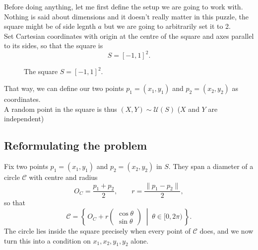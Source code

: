 \documentclass[11pt,a4paper]{article}
\theoremstyle{plain}
\theoremstyle{remark}
\begin{document}
Before doing anything, let me first define the setup we are going to work with. Nothing is said about dimensions and it doesn't really matter in this puzzle, the square might be of side legnth $a$ but we are going to arbitrarily set it to 2.
\\
Set Cartesian coordinates with origin at the centre of the square and axes parallel to its sides, so that the square is
\[
    S = [-1,1]^2 .
\]
\begin{figure}[!ht]
\centering
{}
\caption{The square $S=[-1,1]^2$.}
\end{figure}

That way, we can define our two points $p_1=(x_1, y_1)$ and $p_2 = (x_2, y_2)$  as coordinates. 
\\
A random point in the square is thus $(X, Y) \sim \mathcal{U}(S)$ ($X$ and $Y$ are independent)

\subsection*{Reformulating the problem}

Fix two points $p_1 = (x_1,y_1)$ and $p_2 = (x_2,y_2)$ in $S$. They span a diameter of a circle $\mathcal{C}$ with centre and radius
\[
    O_C = \frac{p_1 + p_2}{2},
    \qquad
    r = \frac{\lVert p_1 - p_2 \rVert}{2},
\]
so that
\[
    \mathcal{C} = \left\{\, O_C + r\begin{pmatrix}\cos\theta \\ \sin\theta \end{pmatrix}
    \;\middle|\; \theta \in [0, 2\pi) \,\right\}.
\]
The circle lies inside the square precisely when every point of $\mathcal{C}$ does, and we now turn this into a condition on $x_1, x_2, y_1, y_2$ alone.
\end{document}
